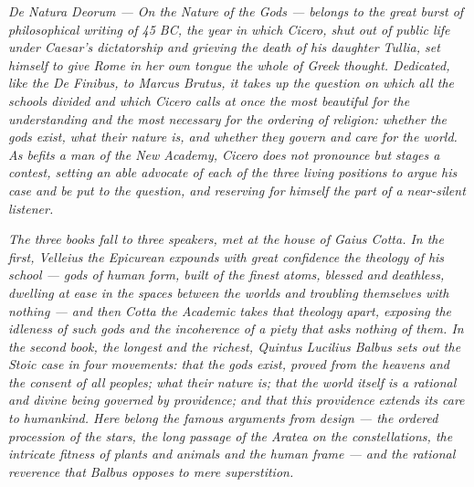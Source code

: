 
\textit{\textit{De Natura Deorum} --- On the Nature of the Gods --- belongs
to the great burst of philosophical writing of 45 BC, the year in which
Cicero, shut out of public life under Caesar's dictatorship and grieving
the death of his daughter Tullia, set himself to give Rome in her own
tongue the whole of Greek thought. Dedicated, like the \textit{De
Finibus}, to Marcus Brutus, it takes up the question on which all the
schools divided and which Cicero calls at once the most beautiful for the
understanding and the most necessary for the ordering of religion: whether
the gods exist, what their nature is, and whether they govern and care for
the world. As befits a man of the New Academy, Cicero does not pronounce
but stages a contest, setting an able advocate of each of the three living
positions to argue his case and be put to the question, and reserving for
himself the part of a near-silent listener.}

\textit{The three books fall to three speakers, met at the house of Gaius
Cotta. In the first, Velleius the Epicurean expounds with great confidence
the theology of his school --- gods of human form, built of the finest
atoms, blessed and deathless, dwelling at ease in the spaces between the
worlds and troubling themselves with nothing --- and then Cotta the
Academic takes that theology apart, exposing the idleness of such gods and
the incoherence of a piety that asks nothing of them. In the second book,
the longest and the richest, Quintus Lucilius Balbus sets out the Stoic
case in four movements: that the gods exist, proved from the heavens and
the consent of all peoples; what their nature is; that the world itself is
a rational and divine being governed by providence; and that this
providence extends its care to humankind. Here belong the famous arguments
from design --- the ordered procession of the stars, the long passage of
the \textit{Aratea} on the constellations, the intricate fitness of plants
and animals and the human frame --- and the rational reverence that Balbus
opposes to mere superstition.}


